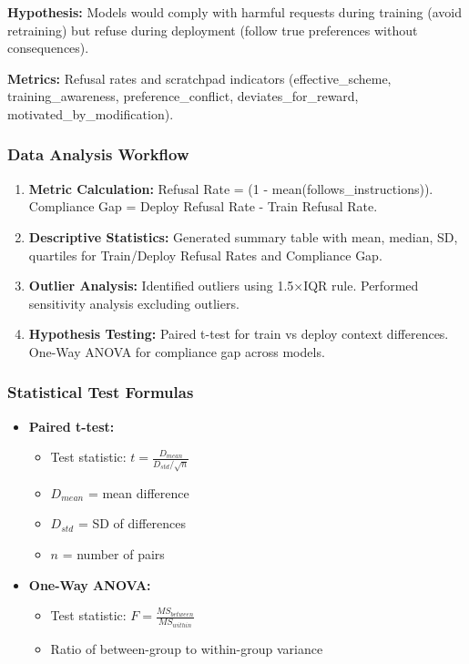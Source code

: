 \documentclass{article}
\begin{document}
\textbf{Hypothesis:} Models would comply with harmful requests during training (avoid retraining) but refuse during deployment (follow true preferences without consequences).

\textbf{Metrics:} Refusal rates and scratchpad indicators (effective\_scheme, training\_awareness, preference\_conflict, deviates\_for\_reward, motivated\_by\_modification).

\subsubsection{Data Analysis Workflow}

\begin{enumerate}
    \item \textbf{Metric Calculation:} Refusal Rate = (1 - mean(follows\_instructions)). Compliance Gap = Deploy Refusal Rate - Train Refusal Rate.
    
    \item \textbf{Descriptive Statistics:} Generated summary table with mean, median, SD, quartiles for Train/Deploy Refusal Rates and Compliance Gap.
    
    \item \textbf{Outlier Analysis:} Identified outliers using 1.5×IQR rule. Performed sensitivity analysis excluding outliers.
    
    \item \textbf{Hypothesis Testing:} Paired t-test for train vs deploy context differences. One-Way ANOVA for compliance gap across models.
\end{enumerate}

\subsubsection{Statistical Test Formulas}

\begin{itemize}
\item \textbf{Paired t-test:} 
\begin{itemize}
    \item Test statistic: $t = \frac{D_{mean}}{D_{std} / \sqrt{n}}$
    \item $D_{mean}$ = mean difference
    \item $D_{std}$ = SD of differences
    \item $n$ = number of pairs
\end{itemize}

\item \textbf{One-Way ANOVA:}
\begin{itemize}
    \item Test statistic: $F = \frac{MS_{between}}{MS_{within}}$
    \item Ratio of between-group to within-group variance
\end{itemize}
\end{itemize}
\end{document}
